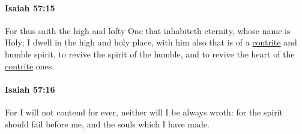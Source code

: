 		\paragraph{Isaiah 57:15} %
			\label{ISAIAH-57-15}

			For thus saith the high and lofty One that inhabiteth eternity, whose name is Holy; I dwell in the high and holy place, with him also that is of a \hyperref[CONTRITE]{contrite} and humble spirit, to revive the spirit of the humble, and to revive the heart of the \hyperref[CONTRITE]{contrite} ones.


		\paragraph{Isaiah 57:16} %
			\label{ISAIAH-57-16}

			For I will not contend for ever, neither will I be always wroth: for the spirit should fail before me, and the souls which I have made.

